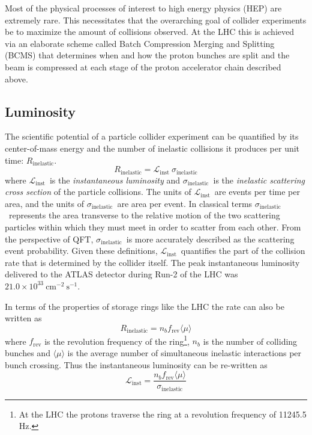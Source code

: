 Most of the physical processes of interest to high energy physics (HEP) are extremely rare.
This necessitates that the overarching goal of collider experiments be to maximize the amount of collisions observed.
At the LHC this is achieved via an elaborate scheme called Batch Compression Merging and Splitting (BCMS) that determines when and how the proton bunches are split and the beam is compressed at each stage of the proton accelerator chain described above.

\subsection{Luminosity}
\newcommand{\CollRate}{\ensuremath{R_{\mathrm{inelastic}}}}
\newcommand{\InstLumi}{\ensuremath{\mathcal{L}_{\mathrm{inst}}}}
\newcommand{\InelXsec}{\ensuremath{\sigma_{\mathrm{inelastic}}}}

The scientific potential of a particle collider experiment can be quantified by its center-of-mass energy and the number of inelastic collisions it produces per unit time: \CollRate.
\begin{equation}
\CollRate = \InstLumi\ \InelXsec
\label{eqn:collision_rate}
\end{equation}
where \InstLumi\ is the \textit{instantaneous luminosity} and \InelXsec\ is the \textit{inelastic scattering cross section} of the particle collisions. The units of \InstLumi\ are events per time per area, and the units of \InelXsec\ are area per event. In classical terms \InelXsec\ represents the area transverse to the relative motion of the two scattering particles within which they must meet in order to scatter from each other. From the perspective of QFT, \InelXsec\ is more accurately described as the scattering event probability. Given these definitions, \InstLumi\ quantifies the part of the collision rate that is determined by the collider itself.
The peak instantaneous luminosity delivered to the ATLAS detector during Run-2 of the LHC was $21.0 \times 10^{33}\ \mathrm{cm}^{-2}\ \mathrm{s}^{-1}$.

In terms of the properties of storage rings like the LHC the rate can also be written as
\begin{equation}
\CollRate = n_b f_{\mathrm{rev}} \langle \mu \rangle
\label{eqn:collision_rate_beam}
\end{equation}
where $f_{\mathrm{rev}}$ is the revolution frequency of the ring\footnote{At the LHC the protons traverse the ring at a revolution frequency of 11245.5 Hz.}, $n_b$ is the number of colliding bunches and $\langle \mu \rangle$ is the average number of simultaneous inelastic interactions per bunch crossing.
Thus the instantaneous luminosity can be re-written as
\begin{equation}
\InstLumi = \frac{n_b f_{\mathrm{rev}} \langle \mu \rangle}{\InelXsec}
\label{eqn:inst_lumi_ring}
\end{equation}

